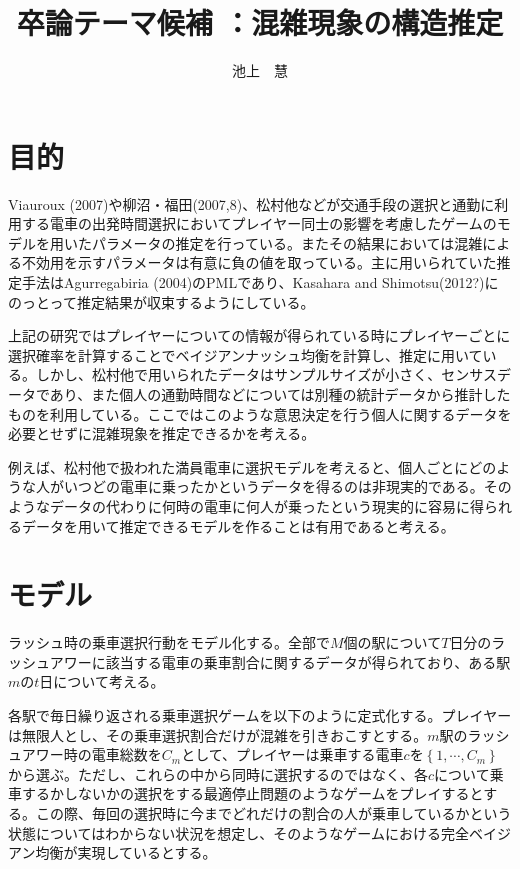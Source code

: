 \documentclass{jsarticle}
\begin{document}
\title{卒論テーマ候補 ：混雑現象の構造推定}
\author{池上　慧}
\maketitle

\section{目的}
Viauroux (2007)や柳沼・福田(2007,8)、松村他などが交通手段の選択と通勤に利用する電車の出発時間選択においてプレイヤー同士の影響を考慮したゲームのモデルを用いたパラメータの推定を行っている。またその結果においては混雑による不効用を示すパラメータは有意に負の値を取っている。主に用いられていた推定手法はAgurregabiria (2004)のPMLであり、Kasahara and Shimotsu(2012?)にのっとって推定結果が収束するようにしている。

上記の研究ではプレイヤーについての情報が得られている時にプレイヤーごとに選択確率を計算することでベイジアンナッシュ均衡を計算し、推定に用いている。しかし、松村他で用いられたデータはサンプルサイズが小さく、センサスデータであり、また個人の通勤時間などについては別種の統計データから推計したものを利用している。ここではこのような意思決定を行う個人に関するデータを必要とせずに混雑現象を推定できるかを考える。

例えば、松村他で扱われた満員電車に選択モデルを考えると、個人ごとにどのような人がいつどの電車に乗ったかというデータを得るのは非現実的である。そのようなデータの代わりに何時の電車に何人が乗ったという現実的に容易に得られるデータを用いて推定できるモデルを作ることは有用であると考える。

\section{モデル}
ラッシュ時の乗車選択行動をモデル化する。全部で$M$個の駅について$T$日分のラッシュアワーに該当する電車の乗車割合に関するデータが得られており、ある駅$m$の$t$日について考える。

各駅で毎日繰り返される乗車選択ゲームを以下のように定式化する。プレイヤーは無限人とし、その乗車選択割合だけが混雑を引きおこすとする。$m$駅のラッシュアワー時の電車総数を$C_m$として、プレイヤーは乗車する電車$c$を$\left\{ 1, \cdots, C_m\right\}$から選ぶ。ただし、これらの中から同時に選択するのではなく、各$c$について乗車するかしないかの選択をする最適停止問題のようなゲームをプレイするとする。この際、毎回の選択時に今までどれだけの割合の人が乗車しているかという状態についてはわからない状況を想定し、そのようなゲームにおける完全ベイジアン均衡が実現しているとする。
\end{document}
